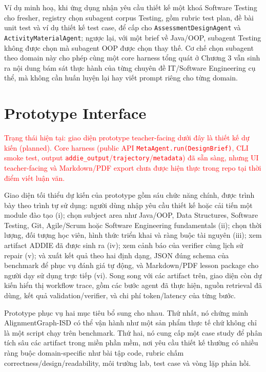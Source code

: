 \documentclass[../main.tex]{subfiles}
\begin{document}
Ví dụ minh hoạ, khi ứng dụng nhận yêu cầu thiết kế một khoá Software Testing cho fresher, registry chọn subagent corpus Testing, gồm rubric test plan, đề bài unit test và ví dụ thiết kế test case, để cấp cho \texttt{AssessmentDesignAgent} và \texttt{ActivityMaterialAgent}; ngược lại, với một brief về Java/OOP, subagent Testing không được chọn mà subagent OOP được chọn thay thế. Cơ chế chọn subagent theo domain này cho phép cùng một core harness tổng quát ở Chương 3 vẫn sinh ra nội dung bám sát thực hành của từng chuyên đề IT/Software Engineering cụ thể, mà không cần huấn luyện lại hay viết prompt riêng cho từng domain.

\section{Prototype Interface}

\textcolor{red}{Trạng thái hiện tại: giao diện prototype teacher-facing dưới đây là thiết kế dự kiến (planned). Core harness (public API \texttt{MetaAgent.run(DesignBrief)}, CLI smoke test, output \texttt{addie\_output}/\texttt{trajectory}/\texttt{metadata}) đã sẵn sàng, nhưng UI teacher-facing và Markdown/PDF export chưa được hiện thực trong repo tại thời điểm viết luận văn.}

Giao diện tối thiểu dự kiến của prototype gồm sáu chức năng chính, được trình bày theo trình tự sử dụng: người dùng nhập yêu cầu thiết kế hoặc cải tiến một module đào tạo (i); chọn subject area như Java/OOP, Data Structures, Software Testing, Git, Agile/Scrum hoặc Software Engineering fundamentals (ii); chọn thời lượng, đối tượng học viên, hình thức triển khai và ràng buộc tài nguyên (iii); xem artifact ADDIE đã được sinh ra (iv); xem cảnh báo của verifier cùng lịch sử repair (v); và xuất kết quả theo hai định dạng, JSON đúng schema của benchmark để phục vụ đánh giá tự động, và Markdown/PDF lesson package cho người dạy sử dụng trực tiếp (vi). Song song với các artifact trên, giao diện còn dự kiến hiển thị workflow trace, gồm các bước agent đã thực hiện, nguồn retrieval đã dùng, kết quả validation/verifier, và chi phí token/latency của từng bước.

Prototype phục vụ hai mục tiêu bổ sung cho nhau. Thứ nhất, nó chứng minh AlignmentGraph-ISD có thể vận hành như một sản phẩm thực tế chứ không chỉ là một script chạy trên benchmark. Thứ hai, nó cung cấp một case study để phân tích sâu các artifact trong miền phần mềm, nơi yêu cầu thiết kế thường có nhiều ràng buộc domain-specific như bài tập code, rubric chấm correctness/design/readability, môi trường lab, test case và vòng lặp phản hồi.
\end{document}
